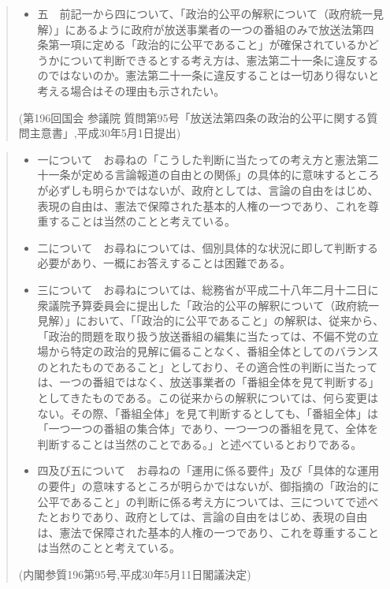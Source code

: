 \begin{quote}
\begin{itemize}
    \item 五　前記一から四について、「政治的公平の解釈について（政府統一見解）」にあるように政府が放送事業者の一つの番組のみで放送法第四条第一項に定める「政治的に公平であること」が確保されているかどうかについて判断できるとする考え方は、憲法第二十一条に違反するのではないのか。憲法第二十一条に違反することは一切あり得ないと考える場合はその理由も示されたい。
  \end{itemize}
  {\small (第196回国会 参議院 質問第95号「放送法第四条の政治的公平に関する質問主意書」,平成30年5月1日提出)}
\end{quote}
\begin{quote}
  \begin{itemize}
    \item 一について　お尋ねの「こうした判断に当たっての考え方と憲法第二十一条が定める言論報道の自由との関係」の具体的に意味するところが必ずしも明らかではないが、政府としては、言論の自由をはじめ、表現の自由は、憲法で保障された基本的人権の一つであり、これを尊重することは当然のことと考えている。

    \item 二について　お尋ねについては、個別具体的な状況に即して判断する必要があり、一概にお答えすることは困難である。

    \item 三について　お尋ねについては、総務省が平成二十八年二月十二日に衆議院予算委員会に提出した「政治的公平の解釈について（政府統一見解）」において、「「政治的に公平であること」の解釈は、従来から、「政治的問題を取り扱う放送番組の編集に当たっては、不偏不党の立場から特定の政治的見解に偏ることなく、番組全体としてのバランスのとれたものであること」としており、その適合性の判断に当たっては、一つの番組ではなく、放送事業者の「番組全体を見て判断する」としてきたものである。この従来からの解釈については、何ら変更はない。その際、「番組全体」を見て判断するとしても、「番組全体」は「一つ一つの番組の集合体」であり、一つ一つの番組を見て、全体を判断することは当然のことである。」と述べているとおりである。

    \item 四及び五について　お尋ねの「運用に係る要件」及び「具体的な運用の要件」の意味するところが明らかではないが、御指摘の「政治的に公平であること」の判断に係る考え方については、三についてで述べたとおりであり、政府としては、言論の自由をはじめ、表現の自由は、憲法で保障された基本的人権の一つであり、これを尊重することは当然のことと考えている。
  \end{itemize}
  {\small (内閣参質196第95号,平成30年5月11日閣議決定)}
\end{quote}

